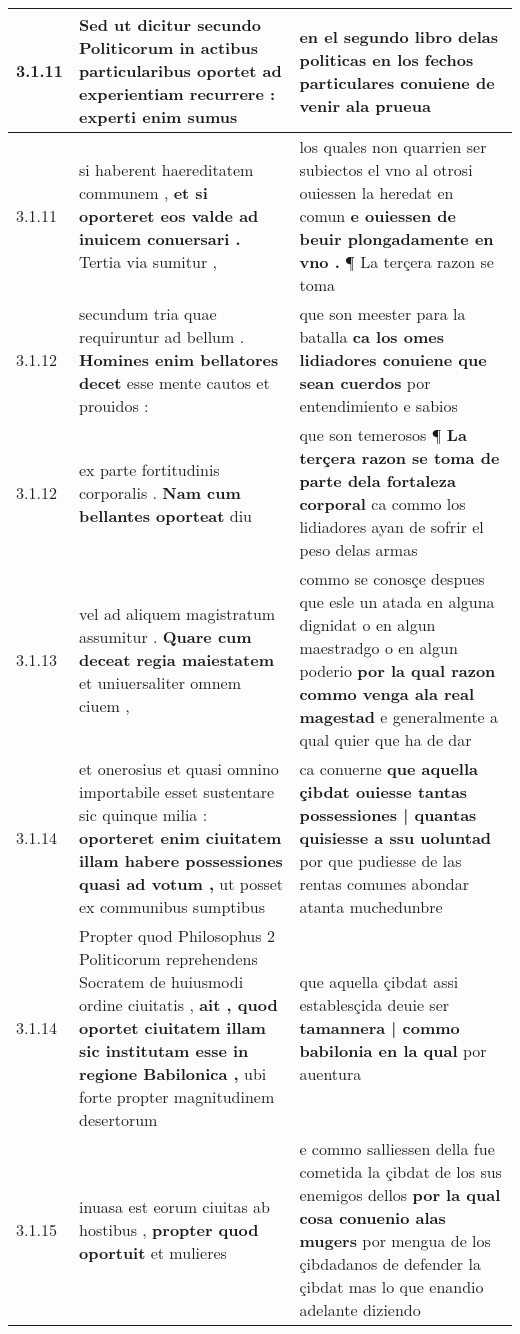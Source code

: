 \begin{tabular}{|p{1cm}|p{6.5cm}|p{6.5cm}|}
3.1.11 & Sed ut dicitur secundo Politicorum \textbf{ in actibus particularibus oportet } ad experientiam recurrere : experti enim sumus & en el segundo libro delas politicas \textbf{ en los fechos particulares } conuiene de venir ala prueua \\\hline
3.1.11 & si haberent haereditatem communem , \textbf{ et si oporteret eos valde ad inuicem conuersari . } Tertia via sumitur , & los quales non quarrien ser subiectos el vno al otrosi ouiessen la heredat en comun \textbf{ e ouiessen de beuir plongadamente en vno . } ¶ La terçera razon se toma \\\hline
3.1.12 & secundum tria quae requiruntur ad bellum . \textbf{ Homines enim bellatores decet } esse mente cautos et prouidos : & que son meester para la batalla \textbf{ ca los omes lidiadores conuiene que sean cuerdos } por entendimiento e sabios \\\hline
3.1.12 & ex parte fortitudinis corporalis . \textbf{ Nam cum bellantes oporteat } diu & que son temerosos ¶ \textbf{ La terçera razon se toma de parte dela fortaleza corporal } ca commo los lidiadores ayan de sofrir el peso delas armas \\\hline
3.1.13 & vel ad aliquem magistratum assumitur . \textbf{ Quare cum deceat regia maiestatem } et uniuersaliter omnem ciuem , & commo se conosçe despues que esle un atada en alguna dignidat o en algun maestradgo o en algun poderio \textbf{ por la qual razon commo venga ala real magestad } e generalmente a qual quier que ha de dar \\\hline
3.1.14 & et onerosius et quasi omnino importabile esset sustentare sic quinque milia : \textbf{ oporteret enim ciuitatem illam habere possessiones quasi ad votum , } ut posset ex communibus sumptibus & ca conuerne \textbf{ que aquella çibdat ouiesse tantas possessiones | quantas quisiesse a ssu uoluntad } por que pudiesse de las rentas comunes abondar atanta muchedunbre \\\hline
3.1.14 & Propter quod Philosophus 2 Politicorum reprehendens Socratem de huiusmodi ordine ciuitatis , \textbf{ ait , quod oportet ciuitatem illam sic institutam esse in regione Babilonica , } ubi forte propter magnitudinem desertorum & que aquella çibdat assi establesçida deuie ser \textbf{ tamannera | commo babilonia en la qual } por auentura \\\hline
3.1.15 & inuasa est eorum ciuitas ab hostibus , \textbf{ propter quod oportuit } et mulieres & e commo salliessen della fue cometida la çibdat de los sus enemigos dellos \textbf{ por la qual cosa conuenio alas mugers } por mengua de los çibdadanos de defender la çibdat mas lo que enandio adelante diziendo \\\hline

\end{tabular}
